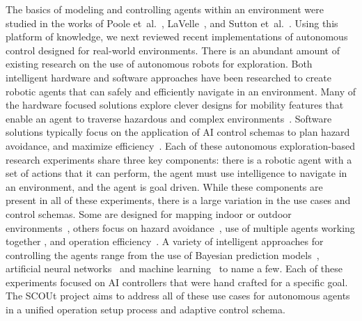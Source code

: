 The basics of modeling and controlling agents within an environment were studied in the works of Poole et~al.~\cite{poole_artificial_2010}, LaVelle~\cite{lavalle_planning_2006}, and Sutton et~al.~\cite{sutton_reinforcement_1998}.
Using this platform of knowledge, we next reviewed recent implementations of autonomous control designed for real-world environments.
There is an abundant amount of existing research on the use of autonomous robots for exploration.
Both intelligent hardware and software approaches have been researched to create robotic agents that can safely and efficiently navigate in an environment.
Many of the hardware focused solutions explore clever designs for mobility features that enable an agent to traverse hazardous and complex environments~\cite{kossett_robust_2011, hopkins_survey_2009, haldane_animal-inspired_2013, hoover_bio-inspired_2010, latscha_design_2014, clark_evolving_2017, smith_tri-wheel:_2015, clark_toward_2006}.
Software solutions typically focus on the application of AI control schemas to plan hazard avoidance, and maximize efficiency~\cite{christensen_multi-robot_2017, tai_autonomous_2017, stachniss_exploration_2004, clark_mobile_2007, perea_strom_robust_2017, fink_tier-scalable_2007, bai_toward_2017}.
Each of these autonomous exploration-based research experiments share three key components: there is a robotic agent with a set of actions that it can perform, the agent must use intelligence to navigate in an environment, and the agent is goal driven.
While these components are present in all of these experiments, there is a large variation in the use cases and control schemas.
Some are designed for mapping indoor or outdoor environments~\cite{tai_autonomous_2017,  stachniss_exploration_2004, perea_strom_robust_2017}, others focus on hazard avoidance~\cite{christensen_multi-robot_2017, fink_tier-scalable_2007}, use of multiple agents working together \cite{christensen_multi-robot_2017, clark_mobile_2007}, and operation efficiency~\cite{bai_toward_2017}.
A variety of intelligent approaches for controlling the agents range from the use of Bayesian prediction models~\cite{christensen_multi-robot_2017}, artificial neural networks~\cite{tai_autonomous_2017} and machine learning~\cite{bai_toward_2017} to name a few.
Each of these experiments focused on AI controllers that were hand crafted for a specific goal.
The SCOUt project aims to address all of these use cases for autonomous agents in a unified operation setup process and adaptive control schema.

